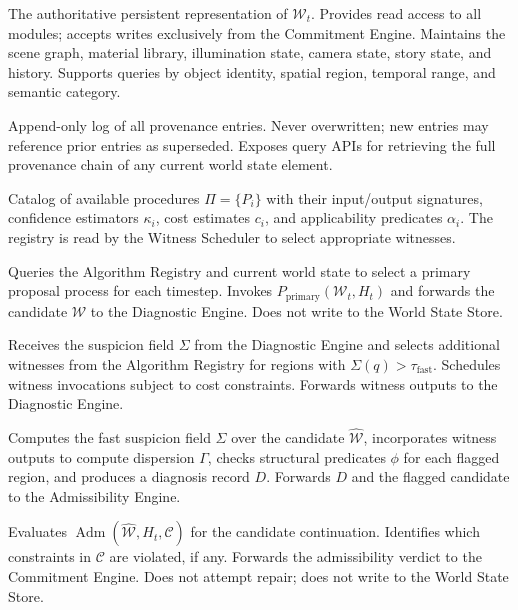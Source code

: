 \documentclass[11pt,a4paper]{article}
\theoremstyle{plain}
\theoremstyle{definition}
\theoremstyle{remark}
\DeclareMathOperator{\Adm}{Adm}
\begin{document}
\begin{description}[leftmargin=2em,itemsep=6pt]

\item[\textbf{World State Store (WSS).}] The authoritative persistent representation of $\mathcal{W}_t$. Provides read access to all modules; accepts writes exclusively from the Commitment Engine. Maintains the scene graph, material library, illumination state, camera state, story state, and history. Supports queries by object identity, spatial region, temporal range, and semantic category.

\item[\textbf{History/Provenance Store (HPS).}] Append-only log of all provenance entries. Never overwritten; new entries may reference prior entries as superseded. Exposes query APIs for retrieving the full provenance chain of any current world state element.

\item[\textbf{Algorithm Registry (AR).}] Catalog of available procedures $\Pi = \{P_i\}$ with their input/output signatures, confidence estimators $\kappa_i$, cost estimates $c_i$, and applicability predicates $\alpha_i$. The registry is read by the Witness Scheduler to select appropriate witnesses.

\item[\textbf{Proposal Engine (PE).}] Queries the Algorithm Registry and current world state to select a primary proposal process for each timestep. Invokes $P_{\mathrm{primary}}(\mathcal{W}_t, H_t)$ and forwards the candidate $\hat{\mathcal{W}}$ to the Diagnostic Engine. Does not write to the World State Store.

\item[\textbf{Witness Scheduler (WS).}] Receives the suspicion field $\Sigma$ from the Diagnostic Engine and selects additional witnesses from the Algorithm Registry for regions with $\Sigma(q) > \tau_{\mathrm{fast}}$. Schedules witness invocations subject to cost constraints. Forwards witness outputs to the Diagnostic Engine.

\item[\textbf{Diagnostic Engine (DE).}] Computes the fast suspicion field $\Sigma$ over the candidate $\hat{\mathcal{W}}$, incorporates witness outputs to compute dispersion $\Gamma$, checks structural predicates $\phi$ for each flagged region, and produces a diagnosis record $D$. Forwards $D$ and the flagged candidate to the Admissibility Engine.

\item[\textbf{Admissibility Engine (AE).}] Evaluates $\Adm(\hat{\mathcal{W}}, H_t, \mathcal{C})$ for the candidate continuation. Identifies which constraints in $\mathcal{C}$ are violated, if any. Forwards the admissibility verdict to the Commitment Engine. Does not attempt repair; does not write to the World State Store.


\end{description}
\end{document}
